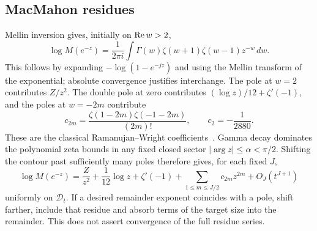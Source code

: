 \documentclass[11pt]{article}
\theoremstyle{remark}\newtheorem{remark}[theorem]{Remark}
\begin{document}
\subsection{MacMahon residues}
Mellin inversion gives, initially on $\operatorname{Re} w>2$,
\begin{equation}\label{stp:len:eq:mellin}
 \log M(e^{-z})=\frac1{2\pi i}\int
 \Gamma(w)\zeta(w+1)\zeta(w-1)z^{-w}\,dw.
\end{equation}
This follows by expanding $-\log(1-e^{-jz})$ and using the Mellin transform of the exponential; absolute convergence justifies interchange. The pole at $w=2$ contributes $Z/z^2$. The double pole at zero contributes $(\log z)/12+\zeta'(-1)$, and the poles at $w=-2m$ contribute
\begin{equation}\label{stp:len:eq:c2m}
 c_{2m}=\frac{\zeta(1-2m)\zeta(-1-2m)}{(2m)!},\qquad c_2=-\frac1{2880}.
\end{equation}
These are the classical Ramanujan--Wright coefficients~\cite{koshkin,wright}. Gamma decay dominates the polynomial zeta bounds in any fixed closed sector $|\arg z|\le\alpha<\pi/2$. Shifting the contour past sufficiently many poles therefore gives, for each fixed $J$,
\begin{equation}\label{stp:len:eq:Mexp}
 \log M(e^{-z})=\frac Z{z^2}+\frac1{12}\log z+\zeta'(-1)
 +\sum_{1\le m\le J/2}c_{2m}z^{2m}+O_J(t^{J+1})
\end{equation}
uniformly on $\mathcal D_t$. If a desired remainder exponent coincides with a pole, shift farther, include that residue and absorb terms of the target size into the remainder. This does not assert convergence of the full residue series.
\end{document}
